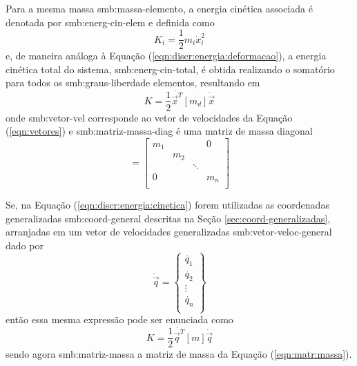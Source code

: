\documentclass[12pt,openright,oneside,a4paper,
	chapter=TITLE,section=TITLE,
	english,brazil]{abntex2}
\begin{document}
	Para a mesma massa \gls{smb:massa-elemento}, a energia cinética associada é denotada por \gls{smb:energ-cin-elem} e definida como \cite{rao:2008}
	\begin{equation}
		K_i = \frac{1}{2}m_i\dot{x}_i^2
	\end{equation}
	e, de maneira análoga à Equação (\ref{eqn:discr:energia:deformacao}), a energia cinética total do sistema, \gls{smb:energ-cin-total}, é obtida realizando o somatório para todos os \gls{smb:graus-liberdade} elementos, resultando em \cite{savi:2017}
	\begin{equation}\label{eqn:discr:energia:cinetica}
		K = \frac{1}{2}\dot{\vec{x}^T}[m_d]\dot{\vec{x}}
	\end{equation}
	onde \gls{smb:vetor-vel} corresponde ao vetor de velocidades da Equação (\ref{eqn:vetores}) e \gls{smb:matriz-massa-diag} é uma matriz de massa diagonal
	\begin{equation}
		[m_d] =
		\begin{bmatrix}
			m_1 & & & 0\\
			& m_2\\
			& & \ddots\\
			0 & & & m_n\\
		\end{bmatrix}
	\end{equation}
	
	Se, na Equação (\ref{eqn:discr:energia:cinetica}) forem utilizadas as coordenadas generalizadas \gls{smb:coord-general} descritas na Seção \ref{sec:coord-generalizadas}, arranjadas em um vetor de velocidades generalizadas \gls{smb:vetor-veloc-general} dado por
	\begin{equation}
		\dot{\vec{q}} = 
		\begin{Bmatrix}
			\dot{q_1}\\ \dot{q_2}\\ \vdots\\ \dot{q_n}\\
		\end{Bmatrix}
	\end{equation}
	então essa mesma expressão pode ser enunciada como \cite{rao:2008}
	\begin{equation}
		K = \frac{1}{2}\dot{\vec{q}^T}[m]\dot{\vec{q}}
	\end{equation}
	sendo agora \gls{smb:matriz-massa} a matriz de massa da Equação (\ref{eqn:matr:massa}).
	
\end{document}
